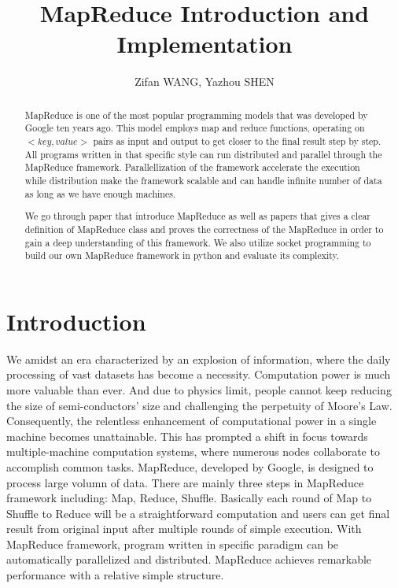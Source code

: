 \documentclass{article}
\title{MapReduce Introduction and Implementation}
\author{Zifan WANG, Yazhou SHEN}
\begin{document}
\maketitle

\begin{abstract}

MapReduce \cite{dean2008mapreduce} is one of the most popular programming models that was developed by Google ten years ago. This model employs map and reduce functions, operating on $<key, value>$ pairs as input and output to get closer to the final result step by step. All programs written in that specific style can run distributed and parallel through the MapReduce framework. Parallellization of the framework accelerate the 
execution while distribution make the framework scalable and can handle infinite number of data as long as we have enough machines.

We go through paper that introduce MapReduce as well as papers that gives a clear definition of MapReduce class and proves the correctness of the MapReduce in order to gain a deep understanding of this framework.
We also utilize socket programming to build our own MapReduce framework in python and evaluate its complexity.


\end{abstract}

\section{Introduction}
We amidst an era characterized by an explosion of information, where the daily processing of vast datasets has become a necessity. 
Computation power is much more valuable than ever. And due to physics limit, people cannot keep reducing the size of semi-conductors' size and challenging the perpetuity of Moore's Law.  Consequently, the relentless enhancement of computational power in a single machine becomes unattainable. This has prompted a shift in focus towards multiple-machine computation systems, where numerous nodes collaborate to accomplish common tasks.
MapReduce, developed by Google, is designed to process large volumn of data. There are mainly three steps in MapReduce framework including: Map, Reduce, Shuffle. Basically each round of Map to Shuffle to Reduce will be 
a straightforward computation and users can get final result from original input after multiple rounds of simple execution. With MapReduce framework,
program written in specific paradigm can be automatically parallelized and distributed. MapReduce achieves remarkable performance with a relative simple structure.
\end{document}
